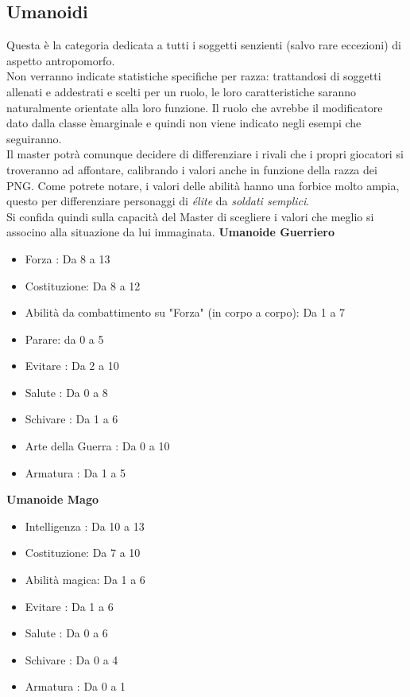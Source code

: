 \documentclass[../manuale_main.tex]{subfiles}
\begin{document}
\subsection{Umanoidi}
Questa è la categoria dedicata a tutti i soggetti senzienti (salvo rare eccezioni) di aspetto antropomorfo.\\
Non verranno indicate statistiche specifiche per razza: trattandosi di soggetti allenati e addestrati e scelti per un ruolo, le loro caratteristiche saranno naturalmente orientate alla loro funzione. Il ruolo che avrebbe il modificatore dato dalla classe èmarginale e quindi non viene indicato negli esempi che seguiranno.\\
Il master potrà comunque decidere di differenziare i rivali che i propri giocatori si troveranno ad affontare, calibrando i valori anche in funzione della razza dei PNG. Come potrete notare, i valori delle abilità hanno una forbice molto ampia, questo per differenziare personaggi di \emph{élite} da \emph{soldati semplici}.\\
Si confida quindi sulla capacità del Master di scegliere i valori che meglio si associno alla situazione da lui immaginata.
\clearpage
\textbf{Umanoide Guerriero}
\begin{itemize}
\item Forza : Da 8 a 13
\item Costituzione: Da 8 a 12
\item Abilità da combattimento su "Forza" (in corpo a corpo): Da 1 a 7
\item Parare: da 0 a 5
\item Evitare : Da 2 a 10
\item Salute : Da 0 a 8
\item Schivare : Da 1 a 6
\item Arte della Guerra : Da 0 a 10
\item Armatura : Da 1 a 5
\end{itemize}

\textbf{Umanoide Mago}
\begin{itemize}
\item Intelligenza : Da 10 a 13
\item Costituzione: Da 7 a 10
\item Abilità magica: Da 1 a 6
\item Evitare : Da 1 a 6
\item Salute : Da 0 a 6
\item Schivare : Da 0 a 4
\item Armatura : Da 0 a 1
\end{itemize}
\end{document}
